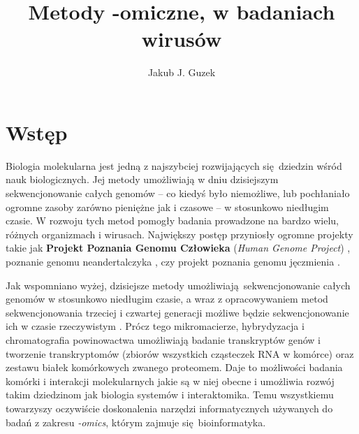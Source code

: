\documentclass[two column, twoside, a4paper]{article}
\title{Metody -omiczne, w badaniach wirusów}
\author{Jakub J. Guzek}
\date{}
\begin{document}
\maketitle

\section{Wstęp}

Biologia molekularna jest jedną z najszybciej rozwijających się dziedzin wśród nauk biologicznych. Jej metody umożliwiają w dniu dzisiejszym sekwencjonowanie całych genomów -- co kiedyś było niemożliwe, lub pochłaniało ogromne zasoby zarówno pieniężne jak i czasowe -- w stosunkowo niedługim czasie. W rozwoju tych metod pomogły badania prowadzone na bardzo wielu, różnych organizmach i wirusach. Największy postęp przyniosły ogromne projekty takie jak \textbf{Projekt Poznania Genomu Człowieka} (\textit{Human Genome Project}) \autocite{IHGSC2001}, poznanie genomu neandertalczyka \autocite{Prufer2014}, czy projekt poznania genomu jęczmienia \autocite{IBGSC2012}.

Jak wspomniano wyżej, dzisiejsze metody umożliwiają sekwencjonowanie całych genomów w stosunkowo niedługim czasie, a wraz z opracowywaniem metod sekwencjonowania trzeciej i czwartej generacji możliwe będzie sekwencjonowanie ich w czasie rzeczywistym \autocite{Brown2019}. Prócz tego mikromacierze, hybrydyzacja i chromatografia powinowactwa umożliwiają badanie transkryptów genów i tworzenie transkryptomów (zbiorów wszystkich cząsteczek RNA w komórce) oraz zestawu białek komórkowych zwanego proteomem. Daje to możliwości badania komórki i interakcji molekularnych jakie są w niej obecne i umożliwia rozwój takim dziedzinom jak biologia systemów i interaktomika. Temu wszystkiemu towarzyszy oczywiście doskonalenia narzędzi informatycznych używanych do badań z zakresu \textit{-omics}, którym zajmuje się bioinformatyka.
\end{document}
